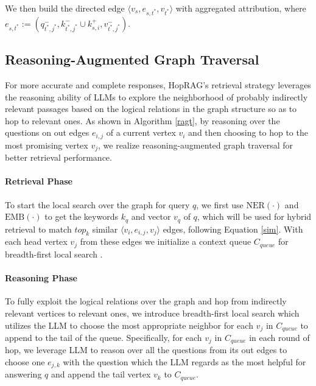 We then build the directed edge $\langle v_s,e_{s,t^*},v_{t^*} \rangle$ with aggregated attribution, where $e_{s,t^*}:=({q_{t^*,j^*}^{-}},{k_{t^*,j^*}^{-}\cup k_{s,i}^{+}},{v_{t^*,j^*}^{-}})$.


\subsection{Reasoning-Augmented Graph Traversal }
For more accurate and complete responses, HopRAG's retrieval strategy leverages the reasoning ability of LLMs to explore the neighborhood of probably indirectly relevant passages based on the logical relations in the graph structure so as to hop to relevant ones.  As shown in Algorithm \ref{ragt}, by reasoning over the questions on out edges $e_{i,j}$ of a current vertex $v_{i}$ and then choosing to hop to the most promising vertex $v_{j}$, we realize reasoning-augmented graph traversal for better retrieval performance. 

\paragraph{Retrieval Phase} To start the local search over the graph for query $q$, we first use $\text{NER}(\cdot)$ and $\text{EMB}(\cdot)$ to get the keywords $ k_{q}$ and vector $v_{q}$ of $q$, which will be used for hybrid retrieval to match $top_k$ similar $\langle v_i,e_{i,j},v_j \rangle $ edges, following Equation \ref{sim}. With each head vertex $v_j$ from these edges we initialize a context queue $C_{queue}$ for breadth-first local search \citep{voudouris2010guided}. 

\paragraph{Reasoning Phase} To fully exploit the logical relations over the graph and hop from indirectly relevant vertices to relevant ones, we introduce breadth-first local search which utilizes the LLM to choose the most appropriate neighbor for each $v_j$ in $C_{queue}$ to append to the tail of the queue. Specifically, for each $v_j$ in $C_{queue}$ in each round of hop, we leverage LLM to reason over all the questions from its out edges  
to choose one $e_{j,k}$ with the question which the LLM regards as the most helpful for answering $q$ and append the tail vertex $v_k$ to $C_{queue}$.  

